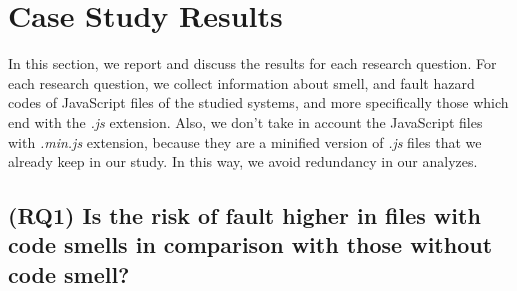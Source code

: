 \section{Case Study Results}\label{sec:case-study}
In this section, we report and discuss the results for each research question. {\color{blue}For each research question, we collect information about smell, and fault hazard codes of JavaScript files of the studied systems, and more specifically those which end with the \textsl{.js} extension. Also, we don't take in account the JavaScript files with \textsl{.min.js} extension, because they are a minified version of \textsl{.js} files that we already keep in our study. In this way, we avoid redundancy in our analyzes.}

\subsection*{(RQ1) Is the risk of fault higher in files with code smells in comparison with those without code smell?}



